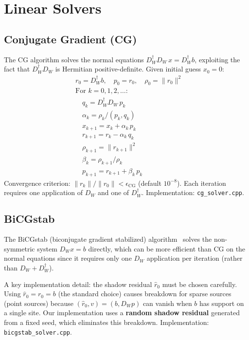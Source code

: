 \documentclass[12pt]{article}
\newcommand{\code}[1]{\texttt{#1}}
\begin{document}
\section{Linear Solvers}
\label{sec:solvers}

\subsection{Conjugate Gradient (CG)}
\label{sec:cg}

The CG algorithm solves the normal equations $D_W^\dagger D_W \, x = D_W^\dagger b$, exploiting the fact that $D_W^\dagger D_W$ is Hermitian positive-definite. Given initial guess $x_0 = 0$:
\begin{align}
&r_0 = D_W^\dagger b, \quad p_0 = r_0, \quad \rho_0 = \|r_0\|^2 \nonumber \\
&\text{For } k = 0, 1, 2, \ldots: \nonumber \\
&\quad q_k = D_W^\dagger D_W \, p_k \nonumber \\
&\quad \alpha_k = \rho_k / (p_k, q_k) \nonumber \\
&\quad x_{k+1} = x_k + \alpha_k \, p_k \nonumber \\
&\quad r_{k+1} = r_k - \alpha_k \, q_k \nonumber \\
&\quad \rho_{k+1} = \|r_{k+1}\|^2 \nonumber \\
&\quad \beta_k = \rho_{k+1} / \rho_k \nonumber \\
&\quad p_{k+1} = r_{k+1} + \beta_k \, p_k
\end{align}
Convergence criterion: $\|r_k\| / \|r_0\| < \epsilon_{\mathrm{CG}}$ (default $10^{-8}$). Each iteration requires one application of $D_W$ and one of $D_W^\dagger$. Implementation: \code{cg\_solver.cpp}.

\subsection{BiCGstab}
\label{sec:bicgstab}

The BiCGstab (biconjugate gradient stabilized) algorithm~\cite{vanderVorst1992} solves the non-symmetric system $D_W x = b$ directly, which can be more efficient than CG on the normal equations since it requires only one $D_W$ application per iteration (rather than $D_W + D_W^\dagger$).

A key implementation detail: the shadow residual $\hat{r}_0$ must be chosen carefully. Using $\hat{r}_0 = r_0 = b$ (the standard choice) causes breakdown for sparse sources (point sources) because $(\hat{r}_0, v) = (b, D_W p)$ can vanish when $b$ has support on a single site. Our implementation uses a \textbf{random shadow residual} generated from a fixed seed, which eliminates this breakdown. Implementation: \code{bicgstab\_solver.cpp}.
\end{document}
